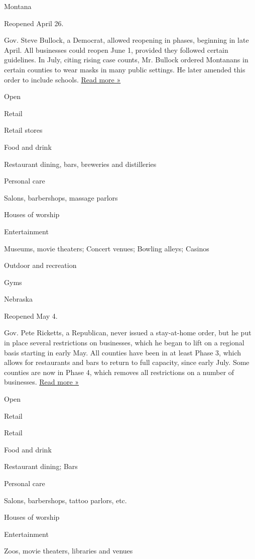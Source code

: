 Montana

Reopened April 26.

Gov. Steve Bullock, a Democrat, allowed reopening in phases, beginning
in late April. All businesses could reopen June 1, provided they
followed certain guidelines. In July, citing rising case counts, Mr.
Bullock ordered Montanans in certain counties to wear masks in many
public settings. He later amended this order to include schools.
\href{https://montanafreepress.org/2020/07/15/bullock-covid-masks-mandatory/}{Read
more »}

Open

Retail

Retail stores

Food and drink

Restaurant dining, bars, breweries and distilleries

Personal care

Salons, barbershops, massage parlors

Houses of worship

Entertainment

Museums, movie theaters; Concert venues; Bowling alleys; Casinos

Outdoor and recreation

Gyms

Nebraska

Reopened May 4.

Gov. Pete Ricketts, a Republican, never issued a stay-at-home order, but
he put in place several restrictions on businesses, which he began to
lift on a regional basis starting in early May. All counties have been
in at least Phase 3, which allows for restaurants and bars to return to
full capacity, since early July. Some counties are now in Phase 4, which
removes all restrictions on a number of businesses.
\href{https://journalstar.com/lifestyles/health-med-fit/health/covid-19-restrictions-eased-in-more-nebraska-counties/article_a548e328-3c36-5dd2-8704-720256692fb3.html}{Read
more »}

Open

Retail

Retail

Food and drink

Restaurant dining; Bars

Personal care

Salons, barbershops, tattoo parlors, etc.

Houses of worship

Entertainment

Zoos, movie theaters, libraries and venues

